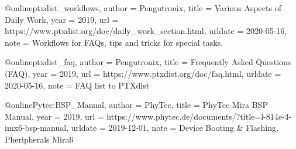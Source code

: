 @online{ptxdist_workflows,
    author = {Pengutronix},
    title = {Various Aspects of Daily Work},
    year = 2019,
    url = {https://www.ptxdist.org/doc/daily_work_section.html},
    urldate = {2020-05-16},
    note = {Workflows for FAQs, tips and tricks for special tasks.}
}

@online{ptxdist_faq,
    author = {Pengutronix},
    title = {Frequently Asked Questions (FAQ)},
    year = 2019,
    url = {https://www.ptxdist.org/doc/faq.html},
    urldate = {2020-05-16},
    note = {FAQ list to PTXdist}
}

@online{Pytec:BSP_Manual,
author = {PhyTec},
title = {{PhyTec Mira} BSP Manual},
year = 2019,
url = {https://www.phytec.de/documents/?title=l-814e-4-imx6-bsp-manual},
urldate = {2019-12-01},
note = {Device Booting \& Flashing, Pheripherals Mira6}
}

